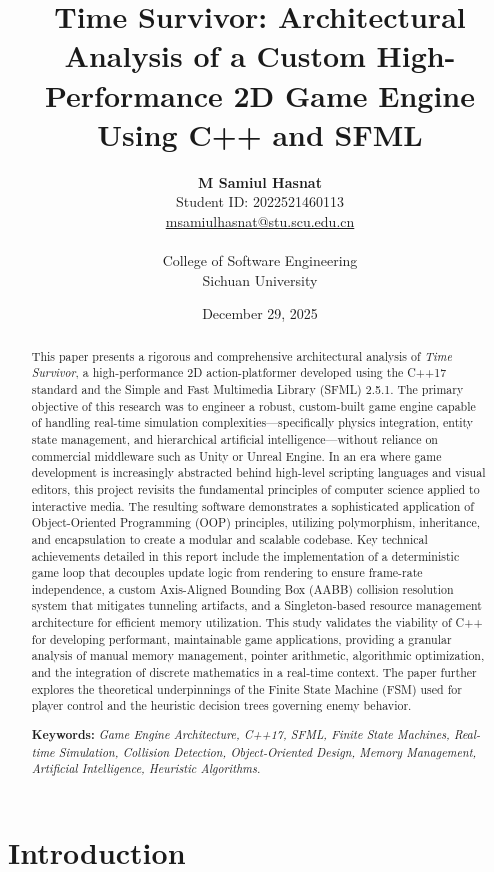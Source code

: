 \documentclass[10pt, a4paper]{article}
\title{\textbf{Time Survivor: Architectural Analysis of a Custom High-Performance 2D Game Engine Using C++ and SFML}}
\author{
    \textbf{M Samiul Hasnat} \\
    Student ID: 2022521460113 \\
    \href{mailto:msamiulhasnat@stu.scu.edu.cn}{msamiulhasnat@stu.scu.edu.cn} \\
    \\
    College of Software Engineering \\
    Sichuan University
}
\date{December 29, 2025}
\begin{document}
\maketitle

\begin{abstract}
This paper presents a rigorous and comprehensive architectural analysis of \textit{Time Survivor}, a high-performance 2D action-platformer developed using the C++17 standard and the Simple and Fast Multimedia Library (SFML) 2.5.1. The primary objective of this research was to engineer a robust, custom-built game engine capable of handling real-time simulation complexities—specifically physics integration, entity state management, and hierarchical artificial intelligence—without reliance on commercial middleware such as Unity or Unreal Engine. In an era where game development is increasingly abstracted behind high-level scripting languages and visual editors, this project revisits the fundamental principles of computer science applied to interactive media. The resulting software demonstrates a sophisticated application of Object-Oriented Programming (OOP) principles, utilizing polymorphism, inheritance, and encapsulation to create a modular and scalable codebase. Key technical achievements detailed in this report include the implementation of a deterministic game loop that decouples update logic from rendering to ensure frame-rate independence, a custom Axis-Aligned Bounding Box (AABB) collision resolution system that mitigates tunneling artifacts, and a Singleton-based resource management architecture for efficient memory utilization. This study validates the viability of C++ for developing performant, maintainable game applications, providing a granular analysis of manual memory management, pointer arithmetic, algorithmic optimization, and the integration of discrete mathematics in a real-time context. The paper further explores the theoretical underpinnings of the Finite State Machine (FSM) used for player control and the heuristic decision trees governing enemy behavior.

\vspace{0.5cm}
\noindent \textbf{Keywords:} \textit{Game Engine Architecture, C++17, SFML, Finite State Machines, Real-time Simulation, Collision Detection, Object-Oriented Design, Memory Management, Artificial Intelligence, Heuristic Algorithms.}
\end{abstract}

\newpage
\tableofcontents
\newpage

\section{Introduction}
\end{document}
